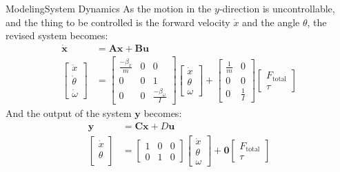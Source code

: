 \documentclass[10pt]{beamer}
\begin{document}
\begin{frame}{Modeling}{System Dynamics}
As the motion in the $y$-direction is uncontrollable, and the thing to be controlled is the forward velocity $\dot{x}$ and the angle $\theta$, the revised system becomes:
\begin{align}
\dot{\mathbf{x}} &= \mathbf{A}\mathbf{x} + \mathbf{B}\mathbf{u}\\
\begin{bmatrix}
\ddot{x}\\
\dot{\theta}\\
\dot{\omega}
\end{bmatrix} &= \begin{bmatrix}
\frac{-\beta_x}{m} & 0 & 0\\
0 & 0 & 1\\
0 & 0 & \frac{-\beta_\omega}{I}
\end{bmatrix}\begin{bmatrix}
\dot{x}\\
\theta\\
\omega
\end{bmatrix} + \begin{bmatrix}
\frac{1}{m} & 0\\
0 & 0\\
0 & \frac{1}{I}
\end{bmatrix}\begin{bmatrix}
F_\text{total}\\
\tau
\end{bmatrix}
\end{align}
And the output of the system $\mathbf{y}$ becomes:
\begin{align}
\mathbf{y} &= \mathbf{C}\mathbf{x} + D\mathbf{u}\\
\begin{bmatrix}
\dot{x}\\
\theta\\
\end{bmatrix} &= \begin{bmatrix}
 1 & 0 & 0\\
 0 & 1 & 0
\end{bmatrix}\begin{bmatrix}
\dot{x}\\
\theta\\
\omega
\end{bmatrix} + \mathbf{0}\begin{bmatrix}
F_\text{total}\\
\tau
\end{bmatrix}
\end{align}
\end{frame}
\end{document}

